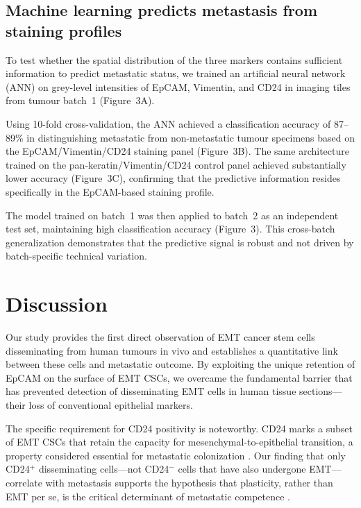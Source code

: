 \documentclass[11pt]{article}
\begin{document}
\subsection{Machine learning predicts metastasis from staining profiles}

To test whether the spatial distribution of the three markers contains sufficient information to predict metastatic status, we trained an artificial neural network (ANN) on grey-level intensities of EpCAM, Vimentin, and CD24 in imaging tiles from tumour batch~1 (Figure~3A).

Using 10-fold cross-validation, the ANN achieved a classification accuracy of 87--89\% in distinguishing metastatic from non-metastatic tumour specimens based on the EpCAM/Vimentin/CD24 staining panel (Figure~3B). The same architecture trained on the pan-keratin/Vimentin/CD24 control panel achieved substantially lower accuracy (Figure~3C), confirming that the predictive information resides specifically in the EpCAM-based staining profile.

The model trained on batch~1 was then applied to batch~2 as an independent test set, maintaining high classification accuracy (Figure~3). This cross-batch generalization demonstrates that the predictive signal is robust and not driven by batch-specific technical variation.

\section{Discussion}

Our study provides the first direct observation of EMT cancer stem cells disseminating from human tumours in vivo and establishes a quantitative link between these cells and metastatic outcome. By exploiting the unique retention of EpCAM on the surface of EMT CSCs, we overcame the fundamental barrier that has prevented detection of disseminating EMT cells in human tissue sections---their loss of conventional epithelial markers.

The specific requirement for CD24 positivity is noteworthy. CD24 marks a subset of EMT CSCs that retain the capacity for mesenchymal-to-epithelial transition, a property considered essential for metastatic colonization \citep{bierie2017integrin}. Our finding that only CD24$^{+}$ disseminating cells---not CD24$^{-}$ cells that have also undergone EMT---correlate with metastasis supports the hypothesis that plasticity, rather than EMT per se, is the critical determinant of metastatic competence \citep{pastushenko2018identification,jolly2019implications}.
\end{document}
